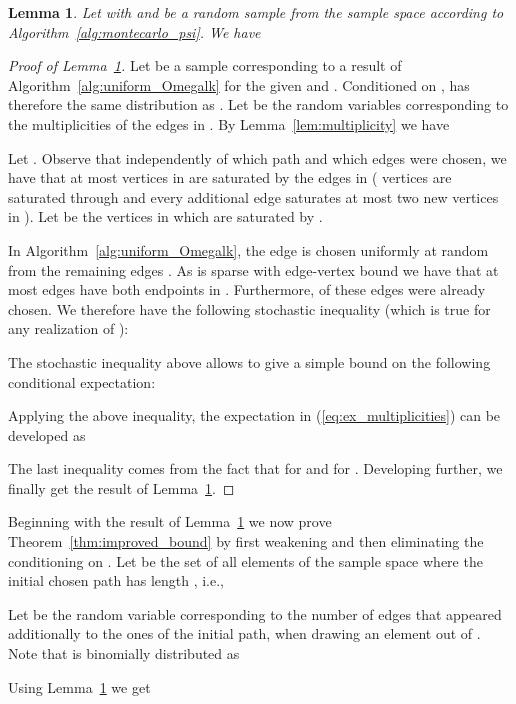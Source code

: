 \documentclass{article}
\newtheorem{lemma}{Lemma}
\begin{document}
\begin{lemma}\label{lem:bound_Omegalk}
Let 
with  and  be
a random sample from the sample space
according to Algorithm~\ref{alg:montecarlo_psi}. We have

\end{lemma}

\begin{proof}[Proof of Lemma~\ref{lem:bound_Omegalk}]
Let  be a sample corresponding
to a result of Algorithm~\ref{alg:uniform_Omegalk} for the
given  and .
Conditioned on ,  has therefore the same
distribution as .
Let  be the random variables
corresponding to the multiplicities of the edges in
. By Lemma~\ref{lem:multiplicity} we
have


Let . Observe that independently of which
path  and which edges  were
chosen, we have that at most  vertices in
 are saturated by the edges in  ( vertices are saturated
through  and every additional edge saturates at most two
new vertices in ). Let  be the vertices in  which
are saturated by .

In Algorithm~\ref{alg:uniform_Omegalk}, the edge  is chosen
uniformly at random from the remaining edges . As  is sparse
with \mbox{edge-vertex} bound  we have that at most  edges have both
endpoints in . Furthermore,  of these edges were already
chosen. We therefore have the following stochastic
inequality (which is true for any realization of
):


The stochastic inequality above allows to give a simple
bound on the following conditional expectation:


Applying the above inequality, the expectation in
(\ref{eq:ex_multiplicities}) can be developed as

The last inequality comes from the fact that  for  and  for .
Developing further, we finally get the result of
Lemma~\ref{lem:bound_Omegalk}.

\end{proof}

Beginning with the result of Lemma~\ref{lem:bound_Omegalk}
we now prove Theorem~\ref{thm:improved_bound} by first weakening and
then eliminating the conditioning on .
Let  be the set of all elements of the sample
space  where the initial chosen path has length
, i.e.,


Let  be the random variable corresponding to the number
of edges that appeared additionally to the ones of the
initial path, when drawing an element out of .
Note that  is binomially distributed as


Using Lemma~\ref{lem:bound_Omegalk} we get
\end{document}
